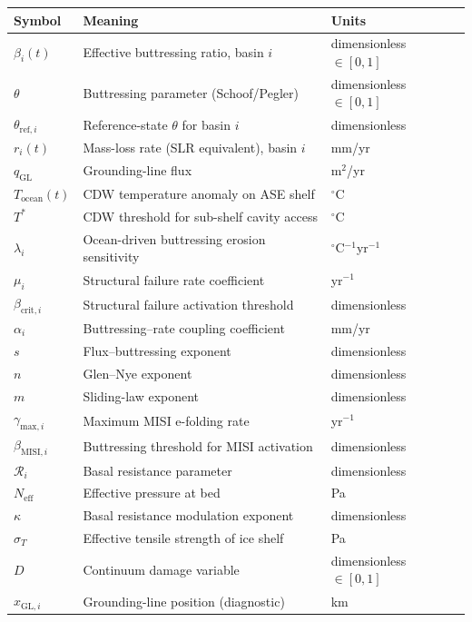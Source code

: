 \documentclass[11pt]{article}
\theoremstyle{definition}
\begin{document}
\begin{center}
\small
\begin{tabular}{lll}
  \toprule
  \textbf{Symbol} & \textbf{Meaning} & \textbf{Units} \\
  \midrule
  $\beta_i(t)$ & Effective buttressing ratio, basin $i$ & dimensionless $\in [0,1]$ \\
  $\theta$ & Buttressing parameter (Schoof/Pegler) & dimensionless $\in [0,1]$ \\
  $\theta_{\text{ref},i}$ & Reference-state $\theta$ for basin $i$ & dimensionless \\
  $r_i(t)$ & Mass-loss rate (SLR equivalent), basin $i$ & mm/yr \\
  $q_\text{GL}$ & Grounding-line flux & m$^2$/yr \\
  $T_{\text{ocean}}(t)$ & CDW temperature anomaly on ASE shelf & ${}^\circ$C \\
  $T^{*}$ & CDW threshold for sub-shelf cavity access & ${}^\circ$C \\
  $\lambda_i$ & Ocean-driven buttressing erosion sensitivity & ${}^\circ$C$^{-1}$yr$^{-1}$ \\
  $\mu_i$ & Structural failure rate coefficient & yr$^{-1}$ \\
  $\beta_{\text{crit},i}$ & Structural failure activation threshold & dimensionless \\
  $\alpha_i$ & Buttressing--rate coupling coefficient & mm/yr \\
  $s$ & Flux--buttressing exponent & dimensionless \\
  $n$ & Glen--Nye exponent & dimensionless \\
  $m$ & Sliding-law exponent & dimensionless \\
  $\gamma_{\text{max},i}$ & Maximum MISI e-folding rate & yr$^{-1}$ \\
  $\beta_{\text{MISI},i}$ & Buttressing threshold for MISI activation & dimensionless \\
  $\mathcal{R}_i$ & Basal resistance parameter & dimensionless \\
  $N_{\text{eff}}$ & Effective pressure at bed & Pa \\
  $\kappa$ & Basal resistance modulation exponent & dimensionless \\
  $\sigma_{T}$ & Effective tensile strength of ice shelf & Pa \\
  $D$ & Continuum damage variable & dimensionless $\in [0,1]$ \\
  $x_{\text{GL},i}$ & Grounding-line position (diagnostic) & km \\

\end{tabular}
\end{center}
\end{document}
